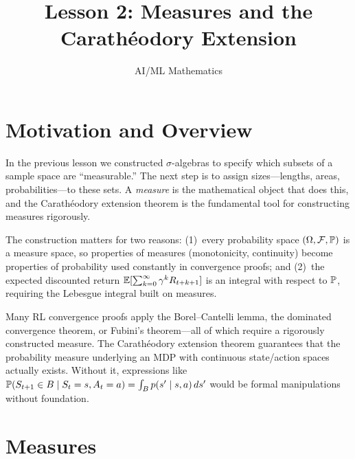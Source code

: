 \documentclass[11pt,a4paper]{article}
\title{Lesson 2: Measures and the Carath\'{e}odory Extension}
\author{AI/ML Mathematics}
\date{}
\begin{document}
\maketitle
\tableofcontents
\newpage


\section{Motivation and Overview}
\label{sec:motivation}

In the previous lesson we constructed $\sigma$-algebras to specify
which subsets of a sample space are ``measurable.'' The next step is to
assign sizes---lengths, areas, probabilities---to these sets. A
\emph{measure} is the mathematical object that does this, and the
Carath\'{e}odory extension theorem is the fundamental tool for
constructing measures rigorously.

The construction matters for two reasons: (1)~every probability space
$(\Omega, \mathcal{F}, \mathbb{P})$ is a measure space, so properties of
measures (monotonicity, continuity) become properties of probability
used constantly in convergence proofs; and (2)~the expected discounted
return $\mathbb{E}[\sum_{k=0}^\infty \gamma^k R_{t+k+1}]$ is an integral
with respect to $\mathbb{P}$, requiring the Lebesgue integral built on
measures.

\begin{rlconnection}[title={Why This Matters for RL}]
Many RL convergence proofs apply the Borel--Cantelli lemma, the
dominated convergence theorem, or Fubini's theorem---all of which
require a rigorously constructed measure. The Carath\'{e}odory
extension theorem guarantees that the probability measure underlying an
MDP with continuous state/action spaces actually exists. Without it,
expressions like
$\mathbb{P}(S_{t+1} \in B \mid S_t = s, A_t = a) = \int_B p(s' \mid s, a)
\,ds'$ would be formal manipulations without foundation.
\end{rlconnection}


\section{Measures}
\label{sec:measures}
\end{document}
